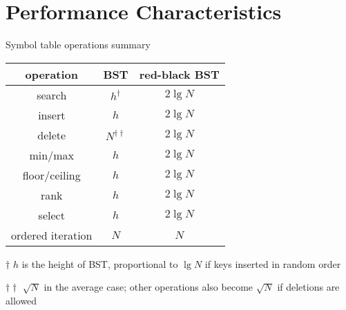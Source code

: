 \documentclass[8pt,a4paper,compress]{beamer}
\begin{document}
\section{Performance Characteristics}
\begin{frame}[fragile]
\pause

Symbol table operations summary

\begin{center}
\begin{tabular}{ccc}
operation & BST & red-black BST \\ \hline
search & $h^\dagger$ & $2\lg N$ \\
insert & $h$ & $2\lg N$ \\
delete & $N^{\dagger\dagger}$ & $2\lg N$ \\
min/max & $h$ & $2\lg N$ \\
floor/ceiling & $h$ & $2\lg N$ \\
rank & $h$ & $2\lg N$ \\
select & $h$ & $2\lg N$ \\
ordered iteration & $N$ & $N$ 
\end{tabular}

\bigskip

\tiny $\dagger$ $h$ is the height of BST, proportional to $\lg N$ if keys inserted in random order

$\dagger\dagger$ $\sqrt{N}$ in the average case; other operations also become $\sqrt{N}$ if deletions are allowed
\end{center} 
\end{frame}
\end{document}
